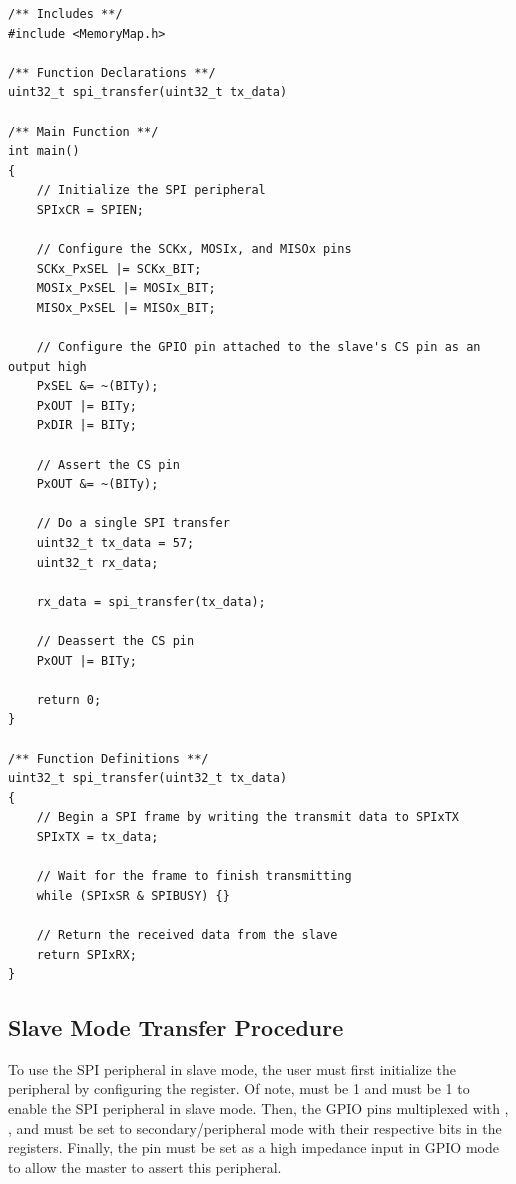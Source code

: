 \begin{lstlisting}[style=customC, label=lst:spi-master-transfer, caption={Example Program for SPI Master Transfers}]
/** Includes **/
#include <MemoryMap.h>

/** Function Declarations **/
uint32_t spi_transfer(uint32_t tx_data)

/** Main Function **/
int main()
{
	// Initialize the SPI peripheral
	SPIxCR = SPIEN;

	// Configure the SCKx, MOSIx, and MISOx pins
	SCKx_PxSEL |= SCKx_BIT;
	MOSIx_PxSEL |= MOSIx_BIT;
	MISOx_PxSEL |= MISOx_BIT;

	// Configure the GPIO pin attached to the slave's CS pin as an output high
	PxSEL &= ~(BITy);
	PxOUT |= BITy;
	PxDIR |= BITy;
	
	// Assert the CS pin
	PxOUT &= ~(BITy);

	// Do a single SPI transfer
	uint32_t tx_data = 57;
	uint32_t rx_data;
	
	rx_data = spi_transfer(tx_data);

	// Deassert the CS pin
	PxOUT |= BITy;

	return 0;
}

/** Function Definitions **/
uint32_t spi_transfer(uint32_t tx_data)
{
	// Begin a SPI frame by writing the transmit data to SPIxTX
	SPIxTX = tx_data;

	// Wait for the frame to finish transmitting
	while (SPIxSR & SPIBUSY) {}

	// Return the received data from the slave
	return SPIxRX;
}
\end{lstlisting}



\subsection{Slave Mode Transfer Procedure}

To use the SPI peripheral in slave mode, the user must first initialize the  peripheral by configuring the  register. Of note,  must be 1 and  must be 1 to enable the SPI peripheral in slave mode. Then, the GPIO pins multiplexed with , , and  must be set to secondary/peripheral mode with their respective bits in the  registers. Finally, the  pin must be set as a high impedance input in GPIO mode to allow the master to assert this  peripheral.

